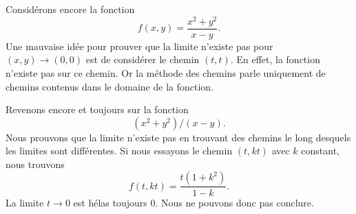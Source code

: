 \begin{example}
	Considérons encore la fonction 
	\begin{equation}
		f(x,y)=\frac{ x^2+y^2 }{ x-y }.
	\end{equation}
	Une mauvaise idée pour prouver que la limite n'existe pas pour $(x,y)\to(0,0)$ est de considérer le chemin $(t,t)$. En effet, la fonction n'existe pas sur ce chemin. Or la méthode des chemins parle uniquement de chemins contenus dans le domaine de la fonction.
\end{example}

\begin{example}     \label{ExmeASDLAf}
	Revenons encore et toujours sur la fonction 
	\begin{equation}
		(x^2+y^2)/(x-y).
	\end{equation}
	Nous prouvons que la limite n'existe pas en trouvant des chemins le long desquels les limites sont différentes. Si nous essayons le chemin \( (t,kt)\) avec \( k\) constant, nous trouvons
    \begin{equation}
        f(t,kt)=\frac{ t(1+k^2) }{ 1-k }.
    \end{equation}
    La limite \( t\to 0\) est hélas toujours \( 0\). Nous ne pouvons donc pas conclure.


\end{example}
